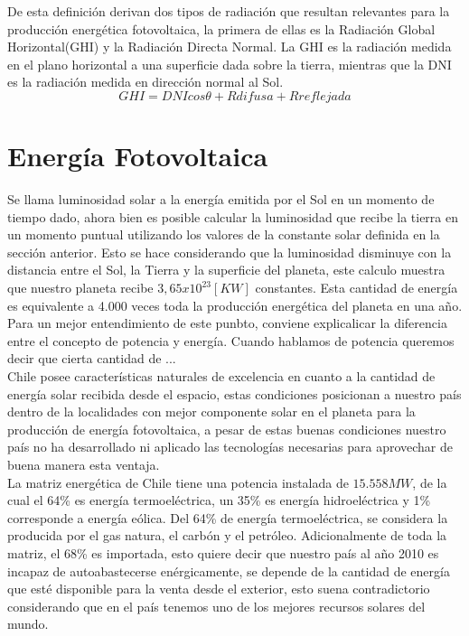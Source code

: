 De esta definición derivan dos tipos de radiación que resultan relevantes para la producción energética fotovoltaica, la primera de ellas es la Radiación Global Horizontal(GHI) y la Radiación Directa Normal. La GHI es la radiación medida en el plano horizontal a una superficie dada sobre la tierra, mientras que la DNI es la radiación medida en dirección normal al Sol.\\ $$ GHI = DNI cos \theta + Rdifusa + Rreflejada $$

\section{Energía Fotovoltaica}
Se llama luminosidad solar a la energía emitida por el Sol en un momento de tiempo dado, ahora bien es posible calcular la luminosidad que recibe la tierra en un momento puntual utilizando los valores de la constante solar definida en la sección anterior. Esto se hace considerando que la luminosidad disminuye con la distancia entre el Sol, la Tierra y la superficie del planeta, este calculo muestra que nuestro planeta recibe  $3,65 x {10}^{23} [KW]$ constantes. Esta cantidad de energía es equivalente a 4.000 veces toda la producción energética del planeta en una año.\\

Para un mejor entendimiento de este punbto, conviene explicalicar la diferencia entre el concepto de potencia y energía. Cuando hablamos de potencia queremos decir que cierta cantidad de ...\\

Chile posee características naturales de excelencia en cuanto a la cantidad de energía solar recibida desde el espacio, estas condiciones posicionan a nuestro país dentro de la localidades con mejor componente solar en el planeta para la producción de energía fotovoltaica, a pesar de estas buenas condiciones nuestro país no ha desarrollado ni aplicado las tecnologías necesarias para aprovechar de buena manera esta ventaja.\\

La matriz energética de Chile tiene una potencia instalada de $15.558 MW$\cite{matrizEnergia:1}, de la cual el 64\% es energía termoeléctrica, un 35\% es energía hidroeléctrica y 1\% corresponde a energía eólica. Del 64\% de energía termoeléctrica, se considera la producida por el gas natura, el carbón y el petróleo. Adicionalmente de toda la matriz, el 68\% es importada\cite{colegioIng:1}, esto quiere decir que nuestro país al año 2010 es incapaz de autoabastecerse enérgicamente, se depende de la cantidad de energía que esté disponible para la venta desde el exterior, esto suena contradictorio considerando que en el país tenemos uno de los mejores recursos solares del mundo.\\

